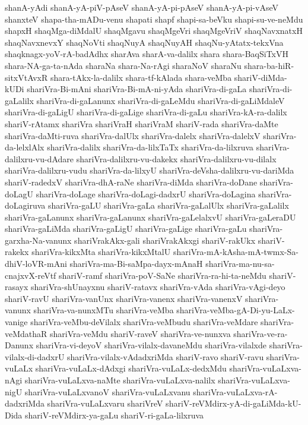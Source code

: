 {shanA-yAdi
shanA-yA-piV-pAseV
shanA-yA-pi-pAseV
shanA-yA-pi-vAseV
shanxteV
shapa-tha-mADu-venu
shapati
shapf
shapi-sa-beVku
shapi-su-ve-neMdu
shapxH
shaqMga-diMdalU
shaqMgavu
shaqMgeVri
shaqMgeVriV
shaqNavxnatxH
shaqNavxnevxY
shaqNoVti
shaqNuyA
shaqNuyAH
shaqNu-yAtatx-tekxVna
shaqknagx-yoV-rA-badAdhx
sharAva
sharA-va-dalilx
shara
shara-BaqSiTxVH
shara-NA-ga-ta-nAda
sharaNa
shara-Na-rAgi
sharaNoV
sharaNu
shara-ba-hiR-sitxVtAvxR
shara-tAkx-la-dalilx
shara-tf-kAlada
shara-veMba
shariV-diMda-kUDi
shariVra-Bi-mAni
shariVra-Bi-mA-ni-yAda
shariVra-di-gaLa
shariVra-di-gaLalilx
shariVra-di-gaLanunx
shariVra-di-gaLeMdu
shariVra-di-gaLiMdaleV
shariVra-di-gaLigU
shariVra-di-gaLige
shariVra-di-gaLu
shariVra-kA-ra-dalilx
shariV-rAtamx
shariVra
shariVraH
shariVraM
shariV-rada
shariVra-daMte
shariVra-daMti-ruva
shariVra-dalUlx
shariVra-dalelx
shariVra-dalelxV
shariVra-da-lelxlAlx
shariVra-dalilx
shariVra-da-lilxTaTx
shariVra-da-lilxruva
shariVra-dalilxru-vu-dAdare
shariVra-dalilxru-vu-dakekx
shariVra-dalilxru-vu-dilalx
shariVra-dalilxru-vudu
shariVra-da-lilxyU
shariVra-deVsha-dalilxru-vu-dariMda
shariV-radedxV
shariVra-dhA-raNe
shariVra-diMda
shariVra-doDane
shariVra-doLagU
shariVra-doLage
shariVra-doLagi-dadxrU
shariVra-doLagina
shariVra-doLagiruva
shariVra-gaLU
shariVra-gaLa
shariVra-gaLalUlx
shariVra-gaLalilx
shariVra-gaLanunx
shariVra-gaLanunx
shariVra-gaLelalxvU
shariVra-gaLeraDU
shariVra-gaLiMda
shariVra-gaLigU
shariVra-gaLige
shariVra-gaLu
shariVra-garxha-Na-vanunx
shariVrakAkx-gali
shariVrakAkxgi
shariV-rakUkx
shariV-rakekx
shariVra-kikxMta
shariVra-kikxMtalU
shariVra-mA-kAsha-mA-twmx-Sa-dhiV-loVR-mAni
shariVra-ma-Bi-saMpa-dayx-mAnaH
shariVra-ma-nu-sa-cnajxvX-reVtf
shariV-ramf
shariVra-poV-SaNe
shariVra-ra-hi-ta-neMdu
shariV-rasayx
shariVra-shUnayxnu
shariV-ratavx
shariVra-vAda
shariVra-vAgi-deyo
shariV-ravU
shariVra-vanUnx
shariVra-vanenx
shariVra-vanenxV
shariVra-vanunx
shariVra-va-nunxMTu
shariVra-veMba
shariVra-veMba-gA-Di-yu-LaLx-vanige
shariVra-veMbu-deVilalx
shariVra-veMbudu
shariVra-veMdare
shariVra-veMdathaR
shariVra-veMdu
shariV-raveV
shariVra-ve-nunxva
shariVra-ve-ra-Danunx
shariVra-vi-deyoV
shariVra-vilalx-davaneMdu
shariVra-vilalxde
shariVra-vilalx-di-dadxrU
shariVra-vilalx-vAdadxriMda
shariV-ravo
shariV-ravu
shariVra-vuLaLx
shariVra-vuLaLx-dAdxgi
shariVra-vuLaLx-dedxMdu
shariVra-vuLaLxva-nAgi
shariVra-vuLaLxva-naMte
shariVra-vuLaLxva-nalilx
shariVra-vuLaLxva-nigU
shariVra-vuLaLxvanoV
shariVra-vuLaLxvanu
shariVra-vuLaLxva-rA-dadxriMda
shariVra-vuLaLxvaru
shariVreV
shariV-reVMdirx-yA-di-gaLiMda-kU-Dida
shariV-reVMdirx-ya-gaLu
shariV-ri-gaLa-lilxruva
}
